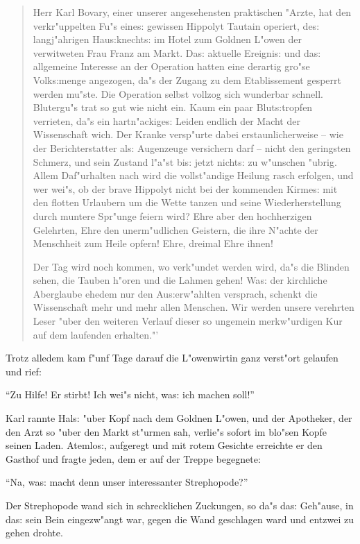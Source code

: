 \documentclass[oneside,12pt]{book}
\newcommand{\s}{s:}%
\begin{document}
\begin{quotation}\noindent
Herr Karl Bovary, einer unserer angesehensten praktischen "Arzte,
hat den verkr"uppelten Fu"s eine{\s} gewissen Hippolyt Tautain
operiert, de{\s} langj"ahrigen Hau{\s}knecht{\s} im Hotel zum
Goldnen L"owen der verwitweten Frau Franz am Markt. Da{\s}
aktuelle Ereigni{\s} und da{\s} allgemeine Interesse an der
Operation hatten eine derartig gro"se Volk{\s}menge angezogen,
da"s der Zugang zu dem Etablissement gesperrt werden mu"ste. Die
Operation selbst vollzog sich wunderbar schnell. Blutergu"s trat
so gut wie nicht ein. Kaum ein paar Blut{\s}tropfen verrieten,
da"s ein hartn"ackige{\s} Leiden endlich der Macht der
Wissenschaft wich. Der Kranke versp"urte dabei erstaunlicherweise
-- wie der Berichterstatter al{\s} Augenzeuge versichern darf --
nicht den geringsten Schmerz, und sein Zustand l"a"st bi{\s} jetzt
nicht{\s} zu w"unschen "ubrig. Allem Daf"urhalten nach wird die
vollst"andige Heilung rasch erfolgen, und wer wei"s, ob der brave
Hippolyt nicht bei der kommenden Kirme{\s} mit den flotten
Urlaubern um die Wette tanzen und seine Wiederherstellung durch
muntere Spr"unge feiern wird? Ehre aber den hochherzigen
Gelehrten, Ehre den unerm"udlichen Geistern, die ihre N"achte der
Menschheit zum Heile opfern! Ehre, dreimal Ehre ihnen!

Der Tag wird noch kommen, wo verk"undet werden wird, da"s die
Blinden sehen, die Tauben h"oren und die Lahmen gehen! Wa{\s} der
kirchliche Aberglaube ehedem nur den Au{\s}erw"ahlten versprach,
schenkt die Wissenschaft mehr und mehr allen Menschen. Wir werden
unsere verehrten Leser "uber den weiteren Verlauf dieser so
ungemein merkw"urdigen Kur auf dem laufenden erhalten."'
\end{quotation}

Trotz alledem kam f"unf Tage darauf die L"owenwirtin ganz
verst"ort gelaufen und rief:

"`Zu Hilfe! Er stirbt! Ich wei"s nicht, wa{\s} ich machen soll!"'

Karl rannte Hal{\s} "uber Kopf nach dem Goldnen L"owen, und der
Apotheker, der den Arzt so "uber den Markt st"urmen sah, verlie"s
sofort im blo"sen Kopfe seinen Laden. Atemlo{\s}, aufgeregt und
mit rotem Gesichte erreichte er den Gasthof und fragte jeden, dem
er auf der Treppe begegnete:

"`Na, wa{\s} macht denn unser interessanter Strephopode?"'

Der Strephopode wand sich in schrecklichen Zuckungen, so da"s
da{\s} Ge\-h"ause, in da{\s} sein Bein eingezw"angt war, gegen
die Wand geschlagen ward und ent\/zwei zu gehen drohte.
\end{document}
